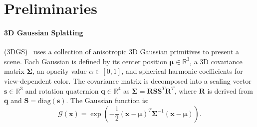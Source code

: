 \documentclass[runningheads]{llncs}
\begin{document}



\section{Preliminaries}

\paragraph{3D Gaussian Splatting }
(3DGS)~\cite{kerbl20233d} uses a collection of anisotropic 3D Gaussian primitives to present a scene. Each Gaussian is defined by its center position $\boldsymbol{\mu} \in \mathbb{R}^3$, a 3D covariance matrix $\boldsymbol{\Sigma}$, an opacity value $\alpha \in [0,1]$, and spherical harmonic coefficients for view-dependent color. The covariance matrix is decomposed into a scaling vector $\mathbf{s} \in \mathbb{R}^3$ and rotation quaternion $\mathbf{q} \in \mathbb{R}^4$ as $\boldsymbol{\Sigma} = \mathbf{R}\mathbf{S}\mathbf{S}^T\mathbf{R}^T$, where $\mathbf{R}$ is derived from $\mathbf{q}$ and $\mathbf{S} = \text{diag}(\mathbf{s})$. The Gaussian function is:
\begin{equation}
\mathcal{G}(\mathbf{x}) = \exp\left(-\frac{1}{2}(\mathbf{x} - \boldsymbol{\mu})^T\boldsymbol{\Sigma}^{-1}(\mathbf{x} - \boldsymbol{\mu})\right).
\end{equation}
\end{document}
